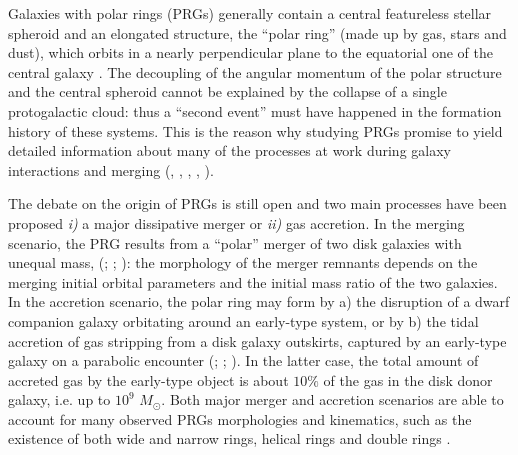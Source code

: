 \documentclass[12pt,preprint]{aastex}
\begin{document}
Galaxies with polar rings (PRGs) generally contain a central
featureless stellar spheroid and an elongated structure, the ``polar
ring'' (made up by gas, stars and dust), which orbits in a nearly
perpendicular plane to the equatorial one of the central galaxy
\citep{Whi90}. The decoupling of the angular momentum of the polar
structure and the central spheroid cannot be explained by the collapse
of a single protogalactic cloud: thus a ``second event'' must have
happened in the formation history of these systems. This is the reason
why studying PRGs promise to yield detailed information about many of
the processes at work during galaxy interactions and merging
(\citealt{Iod02}, \citealt{Iod02A}, \citealt{Res94}, \citealt{Res02},
\citealt{Bou03}).

The debate on the origin of PRGs is still open and two main
  processes have been proposed {\it i)} a major dissipative merger or
  {\it ii)} gas accretion.  In the merging scenario, the PRG results
  from a ``polar'' merger of two disk galaxies with unequal mass,
  (\citealt{Bek97}; \citealt{Bek98}; \citealt{Bou05}): the morphology
  of the merger remnants depends on the merging initial orbital
  parameters and the initial mass ratio of the two galaxies.  In the
  accretion scenario, the polar ring may form by a) the disruption of
  a dwarf companion galaxy orbitating around an early-type system, or
  by b) the tidal accretion of gas stripping from a disk galaxy
  outskirts, captured by an early-type galaxy on a parabolic encounter
  (\citealt{Res97}; \citealt{Bou03}; \citealt{Han09}). In the latter
  case, the total amount of accreted gas by the early-type object is
  about $10\%$ of the gas in the disk donor galaxy, i.e. up to
  $10^{9}$ $M_{\odot}$. Both major merger and accretion scenarios are
  able to account for many observed PRGs morphologies and kinematics,
  such as the existence of both wide and narrow rings, helical rings
  and double rings \citep{Whi90}.
\end{document}
